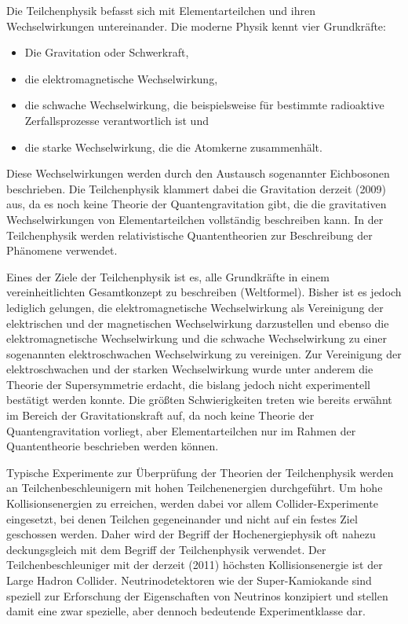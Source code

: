 \documentclass[titlepage, parkskip=full, twocolumn, landscape]{scrartcl}
\begin{document}
Die Teilchenphysik befasst sich mit Elementarteilchen und ihren Wechselwirkungen untereinander. Die moderne Physik kennt vier Grundkräfte:
\begin{itemize}
	\item Die Gravitation oder Schwerkraft,
	\item die elektromagnetische Wechselwirkung,
	\item die schwache Wechselwirkung, die beispielsweise für bestimmte radioaktive Zerfallsprozesse verantwortlich ist und
	\item die starke Wechselwirkung, die die Atomkerne zusammenhält.
\end{itemize}
Diese Wechselwirkungen werden durch den Austausch sogenannter Eichbosonen beschrieben. Die Teilchenphysik klammert dabei die Gravitation derzeit (2009) aus, da es noch keine Theorie der Quantengravitation gibt, die die gravitativen Wechselwirkungen von Elementarteilchen vollständig beschreiben kann. In der Teilchenphysik werden relativistische Quantentheorien zur Beschreibung der Phänomene verwendet.

Eines der Ziele der Teilchenphysik ist es, alle Grundkräfte in einem vereinheitlichten Gesamtkonzept zu beschreiben (Weltformel). Bisher ist es jedoch lediglich gelungen, die elektromagnetische Wechselwirkung als Vereinigung der elektrischen und der magnetischen Wechselwirkung darzustellen und ebenso die elektromagnetische Wechselwirkung und die schwache Wechselwirkung zu einer sogenannten elektroschwachen Wechselwirkung zu vereinigen. Zur Vereinigung der elektroschwachen und der starken Wechselwirkung wurde unter anderem die Theorie der Supersymmetrie erdacht, die bislang jedoch nicht experimentell bestätigt werden konnte. Die größten Schwierigkeiten treten wie bereits erwähnt im Bereich der Gravitationskraft auf, da noch keine Theorie der Quantengravitation vorliegt, aber Elementarteilchen nur im Rahmen der Quantentheorie beschrieben werden können.

Typische Experimente zur Überprüfung der Theorien der Teilchenphysik werden an Teilchenbeschleunigern mit hohen Teilchenenergien durchgeführt. Um hohe Kollisionsenergien zu erreichen, werden dabei vor allem Collider-Experimente eingesetzt, bei denen Teilchen gegeneinander und nicht auf ein festes Ziel geschossen werden. Daher wird der Begriff der Hochenergiephysik oft nahezu deckungsgleich mit dem Begriff der Teilchenphysik verwendet. Der Teilchenbeschleuniger mit der derzeit (2011) höchsten Kollisionsenergie ist der Large Hadron Collider. Neutrinodetektoren wie der Super-Kamiokande sind speziell zur Erforschung der Eigenschaften von Neutrinos konzipiert und stellen damit eine zwar spezielle, aber dennoch bedeutende Experimentklasse dar.
\end{document}
